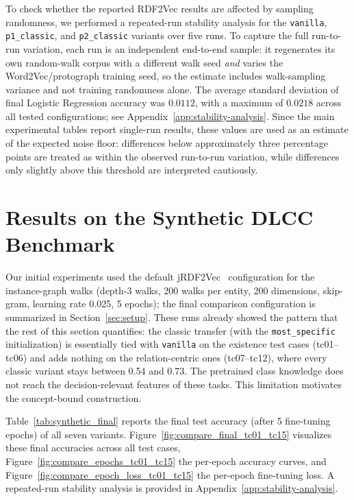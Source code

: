 \documentclass[a4paper,oneside,bibliography=totoc]{scrbook}
\begin{document}
To check whether the reported RDF2Vec results are affected by sampling
randomness, we performed a repeated-run stability analysis for the
\texttt{vanilla}, \texttt{p1\_classic}, and \texttt{p2\_classic} variants over
five runs. To capture the full
run-to-run variation, each run is an independent end-to-end sample: it
regenerates its own random-walk corpus with a different walk seed \emph{and}
varies the Word2Vec/protograph training seed, so the estimate includes
walk-sampling variance and not training randomness alone. The average standard
deviation of final Logistic Regression accuracy was $0.0112$, with a maximum of
$0.0218$ across all tested configurations; see
Appendix~\ref{app:stability-analysis}. Since the main experimental tables report
single-run results, these values are used as an estimate of the expected noise
floor: differences below approximately three percentage points are treated as
within the observed run-to-run variation, while differences only slightly above
this threshold are interpreted cautiously.

\section{Results on the Synthetic DLCC Benchmark}
\label{sec:results_synthetic}

Our initial experiments used the default jRDF2Vec~\cite{portisch_rdf2vec_light_2020} configuration for the
instance-graph walks (depth-3 walks, 200 walks per entity, 200 dimensions,
skip-gram, learning rate 0.025, 5 epochs); the final comparison configuration is
summarized in Section~\ref{sec:setup}. These runs already showed the pattern that
the rest of this section quantifies: the classic transfer (with the
\texttt{most\_specific} initialization) is essentially tied with \texttt{vanilla}
on the existence test cases (tc01--tc06) and adds nothing on the relation-centric
ones (tc07--tc12), where every classic variant stays between 0.54 and 0.73. The
pretrained class knowledge does not reach the decision-relevant features of these
tasks. This limitation motivates the concept-bound construction.

Table~\ref{tab:synthetic_final} reports the final test accuracy (after 5
fine-tuning epochs) of all seven variants.
Figure~\ref{fig:compare_final_tc01_tc15} visualizes these final accuracies across
all test cases, Figure~\ref{fig:compare_epochs_tc01_tc15} the per-epoch accuracy
curves, and Figure~\ref{fig:compare_epoch_loss_tc01_tc15} the per-epoch
fine-tuning loss. A repeated-run stability analysis is provided in Appendix~\ref{app:stability-analysis}.
\end{document}

